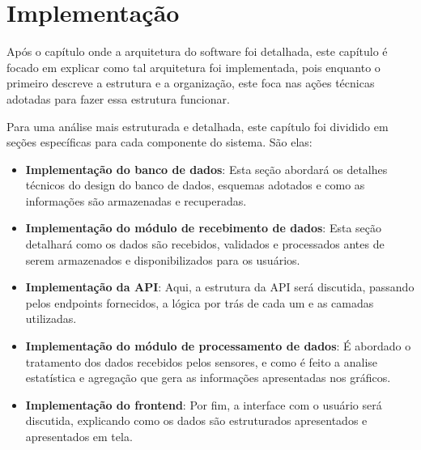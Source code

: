 \chapter{Implementação}\label{cap:implementation}

Após o capítulo onde a arquitetura do software foi detalhada, este capítulo é focado em explicar como tal arquitetura foi implementada, pois enquanto o primeiro descreve a estrutura e a organização, este foca nas ações técnicas adotadas para fazer essa estrutura funcionar.

Para uma análise mais estruturada e detalhada, este capítulo foi dividido em seções específicas para cada componente do sistema. São elas:

\begin{itemize}
    \item \textbf{Implementação do banco de dados}: Esta seção abordará os detalhes técnicos do design do banco de dados, esquemas adotados e como as informações são armazenadas e recuperadas.
    
    \item \textbf{Implementação do módulo de recebimento de dados}: Esta seção detalhará como os dados são recebidos, validados e processados antes de serem armazenados e disponibilizados para os usuários.
    
    \item \textbf{Implementação da API}: Aqui, a estrutura da \gls{API} será discutida, passando pelos endpoints fornecidos, a lógica por trás de cada um e as camadas utilizadas.
    
    \item \textbf{Implementação do módulo de processamento de dados}: É abordado o tratamento dos dados recebidos pelos sensores, e como é feito a analise estatística e agregação que gera as informações apresentadas nos gráficos.
    
    \item \textbf{Implementação do frontend}: Por fim, a interface com o usuário será discutida, explicando como os dados são estruturados apresentados e apresentados em tela.
\end{itemize}







